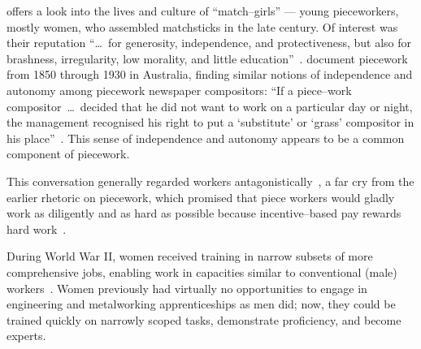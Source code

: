 \documentclass[trackingWork]{subfiles}
\begin{document}
\citeauthor{10.2307/3827491} offers a look into the lives and culture of ``match--girls''
--- young pieceworkers, mostly women, who assembled matchsticks in the late  century.
Of interest was their reputation ``\dots~for generosity, independence, and protectiveness,
but also for brashness, irregularity, low morality, and little education''~\cite{10.2307/3827491}.
\citeauthor{10.2307/27508091} document piecework from 1850 through 1930 in Australia,
finding similar notions of independence and autonomy among piecework newspaper compositors:
``If a piece--work compositor~\dots~decided that he did not want to work on a particular day or night,
the management recognised his right to put a `substitute' or `grass' compositor in his place''~\cite{10.2307/27508091}.
This sense of independence and autonomy appears to be a common component of piecework.

This conversation generally regarded workers antagonistically~\cite{roy1954efficiency}, a far cry from the earlier rhetoric on piecework, which promised that
piece workers would gladly work as diligently and as hard as possible because
incentive--based pay rewards hard work~\cite{clark1908cotton}.


During World War II, women received training in narrow subsets of more comprehensive jobs, enabling work in capacities similar to conventional (male) workers~\cite{hart2013rise}.
Women previously had virtually no opportunities
to engage in engineering and metalworking apprenticeships as men did;
now, they
could be trained quickly on narrowly scoped tasks,
demonstrate proficiency, and become experts.
\end{document}

